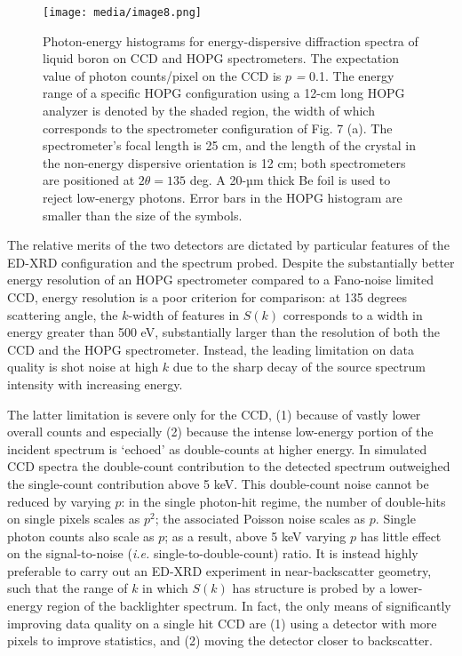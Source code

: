 \begin{figure}[h] \label{edimage8}
\caption{ Photon-energy histograms for energy-dispersive diffraction
spectra of liquid boron on CCD and HOPG spectrometers. The expectation
value of photon counts/pixel on the CCD is \(p\) \emph{=} 0.1. The
energy range of a specific HOPG configuration using a 12-cm long HOPG
analyzer is denoted by the shaded region, the width of which corresponds
to the spectrometer configuration of Fig. 7 (a). The spectrometer's
focal length is 25 cm, and the length of the crystal in the non-energy
dispersive orientation is 12 cm; both spectrometers are positioned at
\(2\theta = 135\) deg. A 20-µm thick Be foil is used to reject
low-energy photons. Error bars in the HOPG histogram are smaller than
the size of the symbols.}
\centering
\texttt{[image: media/image8.png]}
\end{figure}

The relative merits of the two detectors are dictated by particular
features of the ED-XRD configuration and the spectrum probed. Despite
the substantially better energy resolution of an HOPG spectrometer
compared to a Fano-noise limited CCD, energy resolution is a poor
criterion for comparison: at 135 degrees scattering angle, the
\(k\)-width of features in \(S(k)\) corresponds to a width in energy
greater than 500 eV, substantially larger than the resolution of both
the CCD and the HOPG spectrometer. Instead, the leading limitation on
data quality is shot noise at high \(k\) due to the sharp decay of the
source spectrum intensity with increasing energy.

The latter limitation is severe only for the CCD, (1) because of vastly
lower overall counts and especially (2) because the intense low-energy
portion of the incident spectrum is `echoed' as double-counts at higher
energy. In simulated CCD spectra the double-count contribution to the
detected spectrum outweighed the single-count contribution above 5 keV.
This double-count noise cannot be reduced by varying \(p\): in the
single photon-hit regime, the number of double-hits on single pixels
scales as \(p^{2}\); the associated Poisson noise scales as \(p\).
Single photon counts also scale as \(p\); as a result, above 5 keV
varying \(p\) has little effect on the signal-to-noise (\emph{i.e.}
single-to-double-count) ratio. It is instead highly preferable to carry
out an ED-XRD experiment in near-backscatter geometry, such that the
range of \(k\) in which \(S(k)\) has structure is probed by a
lower-energy region of the backlighter spectrum. In fact, the only means
of significantly improving data quality on a single hit CCD are (1)
using a detector with more pixels to improve statistics, and (2) moving
the detector closer to backscatter.

